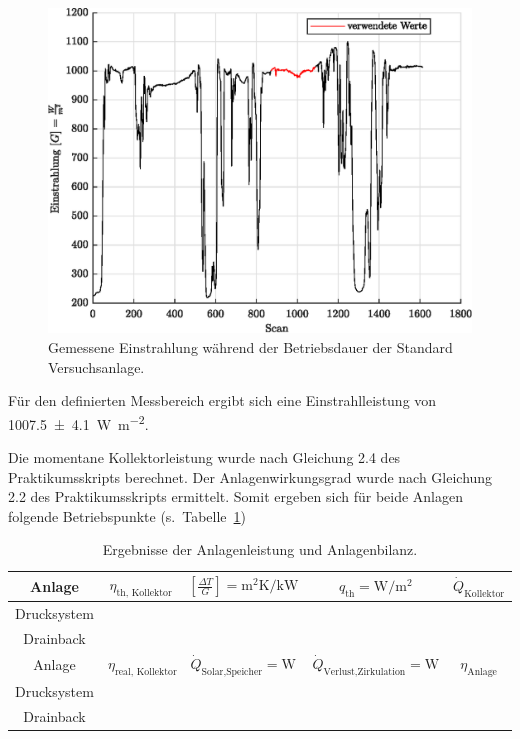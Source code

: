 \begin{figure}[H]
	\centering
	\includegraphics[height=0.3\textheight]{../DATA/DataEinstrahlung.eps}
	\caption[Gemessene Einstrahlung während der Betriebsdauer der Standard Versuchsanlage]{Gemessene Einstrahlung während der Betriebsdauer der Standard Versuchsanlage.}
	\label{fig:Einstrahlung}
\end{figure}

Für den definierten Messbereich ergibt sich eine Einstrahlleistung von \SI{1007.5(41)}{\watt\per\meter\squared}.
 
Die momentane Kollektorleistung wurde nach Gleichung 2.4 des Praktikumsskripts berechnet. Der Anlagenwirkungsgrad wurde nach Gleichung 2.2 des Praktikumsskripts ermittelt. Somit ergeben sich für beide Anlagen folgende Betriebspunkte (s.~Tabelle~\ref{tab:BetPoints})

\begin{table}[H]
	\centering
	\caption{Ergebnisse der Anlagenleistung und Anlagenbilanz.}
	\label{tab:BetPoints}
	\begin{tabular}{ccccc}
		\toprule
		Anlage	&	$\eta_{\text{th, Kollektor}}$	&	$\left[\frac{\Delta T}{G}\right] = \si{\metre\squared\kelvin\per\kilo\watt}$ & $q_{\text{th}} = \si{\watt\per\metre\squared}$ &  $\dot{Q}_{\text{Kollektor}}$ \\
		\midrule
		Drucksystem & & & & \\
		Drainback & & & & \\
		\midrule
		Anlage	&	$\eta_{\text{real, Kollektor}}$	& $\dot{Q}_{\text{Solar,Speicher}} = \si{\watt} $ & $\dot{Q}_{\text{Verlust,Zirkulation}} = \si{\watt}$ & $\eta_{\text{Anlage}}$ \\
		\midrule
		Drucksystem & & & & \\
		Drainback & & & & \\
		\bottomrule
	\end{tabular}
\end{table}

